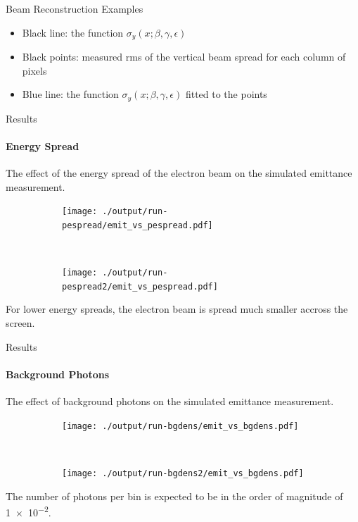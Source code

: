 \documentclass[aspectratio=169]{beamer}
\begin{document}
\begin{frame}{Beam Reconstruction Examples}
	\begin{itemize}
		\item Black line: the function \(\sigma_y \left(x; \beta,\gamma,\epsilon \right)\)
		\item Black points: measured rms of the vertical beam spread for each
			column of pixels
		\item Blue line: the function \(\sigma_y \left(x; \beta,\gamma,\epsilon \right)\)
			fitted to the points
	\end{itemize}

\end{frame}

\begin{frame}[t]{Results}
	\framesubtitle{Energy Spread}
	The effect of the energy spread of the electron beam on the simulated
	emittance measurement.

	\begin{figure}
		\vspace*{-1em}
		\begin{subfigure}[t]{0.45\textwidth}
			\centering
			\texttt{[image: ./output/run-pespread/emit\_vs\_pespread.pdf]}
		\end{subfigure}%
		~
		\begin{subfigure}[t]{0.55\textwidth}
			\centering
			\texttt{[image: ./output/run-pespread2/emit\_vs\_pespread.pdf]}
		\end{subfigure}
	\end{figure}

	For lower energy spreads, the electron beam is spread much smaller
	accross the screen.
\end{frame}

\begin{frame}[t]{Results}
	\framesubtitle{Background Photons}
	The effect of background photons on the simulated emittance measurement.\\

	\begin{figure}[!t]
		\centering
		\vspace*{-1em}
		\begin{subfigure}[t]{0.45\textwidth}
			\centering
			\texttt{[image: ./output/run-bgdens/emit\_vs\_bgdens.pdf]}
		\end{subfigure}%
		~
		\begin{subfigure}[t]{0.55\textwidth}
			\centering
			\texttt{[image: ./output/run-bgdens2/emit\_vs\_bgdens.pdf]}
		\end{subfigure}%
	\end{figure}

	The number of photons per bin is expected to be in the order of magnitude of \num{1e-2}.
\end{frame}
\end{document}
